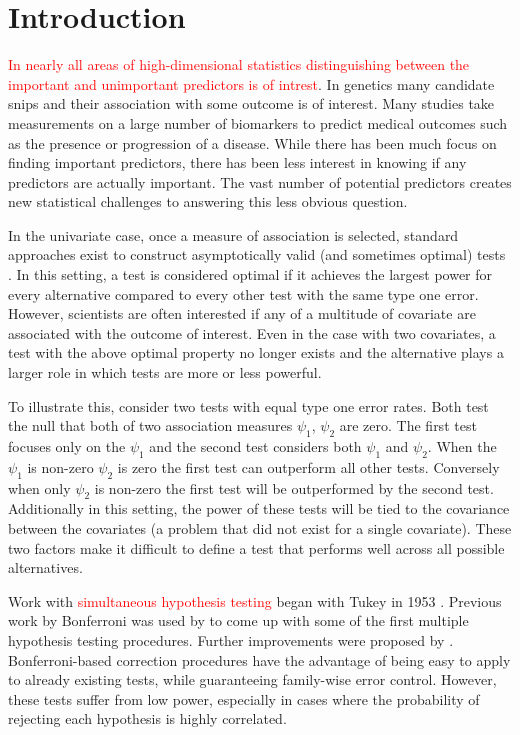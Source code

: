 \documentclass{article}
\author{Adam Elder}
\newcommand{\sh}{\textcolor{red}}
\begin{document}
 \section{Introduction}

\sh{In nearly all areas of high-dimensional statistics distinguishing between the important and unimportant predictors is of intrest}. In genetics many candidate snips and their association with some outcome is of interest. Many studies take measurements on a large number of biomarkers to predict medical outcomes such as the presence or progression of a disease. While there has been much focus on finding important predictors, there has been less interest in knowing if any predictors are actually important.  The vast number of potential predictors creates new statistical challenges to answering this less obvious question. 

In the univariate case, once a measure of association is selected, standard approaches exist to construct asymptotically valid (and sometimes optimal) tests \citep{neyman_jerzy_ix._1933}. In this setting, a test is considered optimal if it achieves the largest power for every alternative compared to every other test with the same type one error.  However, scientists are often interested if any of a multitude of covariate are associated with the outcome of interest.  Even in the case with two covariates, a test with the above optimal property no longer exists and the alternative plays a larger role in which tests are more or less powerful.

To illustrate this, consider two tests with equal type one error rates. Both test the null that both of two association measures $\psi_1$, $\psi_2$ are zero. The first test focuses only on the $\psi_1$ and the second test considers both $\psi_1$ and $\psi_2$.  When the $\psi_1$ is non-zero $\psi_2$ is zero the first test can outperform all other tests.  Conversely when only $\psi_2$ is non-zero the first test will be outperformed by the second test.  Additionally in this setting, the power of these tests will be tied to the covariance between the covariates (a problem that did not exist for a single covariate).  These two factors make it difficult to define a test that performs well across all possible alternatives.  

Work with \textcolor{red}{simultaneous hypothesis testing}
began with Tukey in 1953 \citep{miller_simultaneous_1981}.  Previous work by Bonferroni was used by \citep{dunn_estimation_1959,dunn_multiple_1961} to come up with some of the first multiple hypothesis testing procedures.  Further improvements were proposed by \citep{hochberg_sharper_1988,holm_simple_1979,s._holland_improved_1988}.  Bonferroni-based correction procedures have the advantage of being easy to apply to already existing tests, while guaranteeing family-wise error control. However, these tests suffer from low power, especially in cases where the probability of rejecting each hypothesis is highly correlated. 
\end{document}
